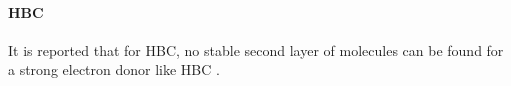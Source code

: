 \label{section_HBBNC}
\paragraph{HBC}It is reported that for HBC, no stable second layer of molecules can be found for a strong electron donor like HBC \cite{de_feyter_two-dimensional_2003}.